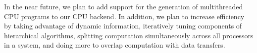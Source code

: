 \documentclass[10pt,twocolumn]{article}
\begin{document}
In the near future, we plan to add support for the generation of multithreaded CPU programs to our CPU backend.  In addition, we plan to increase efficiency by taking advantage of dynamic information, iteratively tuning components of hierarchical algorithms, splitting computation simultaneously across all processors in a system, and doing more to overlap computation with data transfers.

{\small

{}
}
\end{document}

